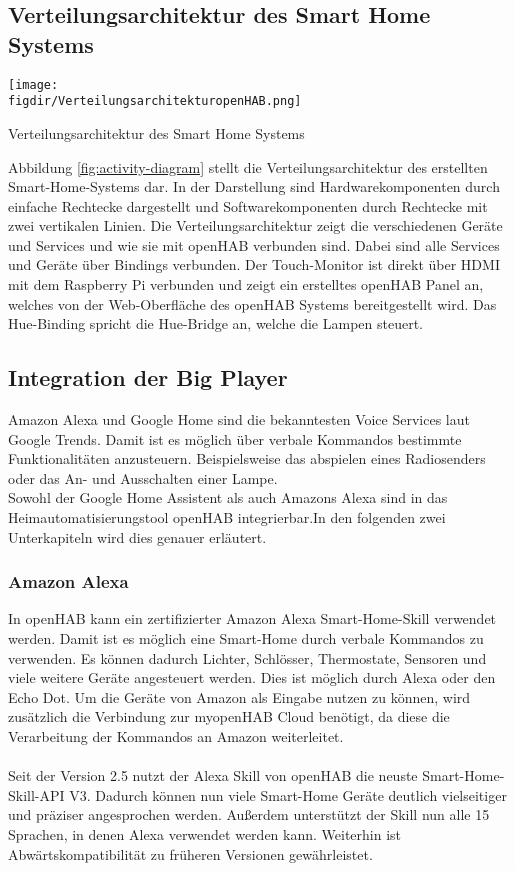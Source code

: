 		
		\subsection{Verteilungsarchitektur des Smart Home Systems}
		
		\smallskip
\begin{minipage}{\textwidth}
	\centering
	\captionsetup{type=figure}
	\texttt{[image: \\figdir/VerteilungsarchitekturopenHAB.png]}
	\caption{Verteilungsarchitektur des Smart Home Systems \label{fig:activity-diagram}}
\end{minipage}

	Abbildung \ref{fig:activity-diagram} stellt die Verteilungsarchitektur des erstellten Smart-Home-Systems dar. In der Darstellung sind Hardwarekomponenten durch einfache Rechtecke dargestellt und Softwarekomponenten durch Rechtecke mit zwei vertikalen Linien. Die Verteilungsarchitektur zeigt die verschiedenen Geräte und Services und wie sie mit openHAB verbunden sind. Dabei sind alle Services und Geräte über Bindings verbunden. Der Touch-Monitor ist direkt über HDMI mit dem Raspberry Pi verbunden und zeigt ein erstelltes openHAB Panel an, welches von der Web-Oberfläche des openHAB Systems bereitgestellt wird. Das Hue-Binding spricht die Hue-Bridge an, welche die Lampen steuert.
	
\subsection{Integration der Big Player}
Amazon Alexa und Google Home sind die bekanntesten Voice Services laut Google Trends. \cite{GOOGLET01:AG} Damit ist es möglich über verbale Kommandos bestimmte Funktionalitäten anzusteuern. Beispielsweise das abspielen eines Radiosenders oder das An- und Ausschalten einer Lampe.\\
Sowohl der Google Home Assistent als auch Amazons Alexa sind in das Heimautomatisierungstool openHAB integrierbar.In den folgenden zwei Unterkapiteln wird dies genauer erläutert.\cite{openHAB02:OH}

\subsubsection{Amazon Alexa}
In openHAB kann ein zertifizierter Amazon Alexa Smart-Home-Skill verwendet werden. Damit ist es möglich eine Smart-Home durch verbale Kommandos zu verwenden. Es können dadurch Lichter, Schlösser, Thermostate, Sensoren und viele weitere Geräte angesteuert werden. Dies ist möglich durch Alexa oder den Echo Dot.\cite{ALEXA01:AL}\cite{ALEXA02:AL}
Um die Geräte von Amazon als Eingabe nutzen zu können, wird zusätzlich die Verbindung zur myopenHAB Cloud benötigt, da diese die Verarbeitung der Kommandos an Amazon weiterleitet.\\
\\
Seit der Version 2.5 nutzt der Alexa Skill von openHAB die neuste Smart-Home-Skill-API V3. Dadurch können nun viele Smart-Home Geräte deutlich vielseitiger und präziser angesprochen werden. Außerdem unterstützt der Skill nun alle 15 Sprachen, in denen Alexa verwendet werden kann. Weiterhin ist Abwärtskompatibilität zu früheren Versionen gewährleistet.\cite{openHAB02:OH}

